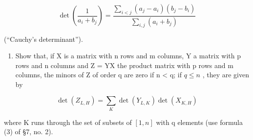 \[
\det \left(\frac {1}{a _ {i} + b _ {j}}\right) = \frac {\sum_ {i <   j} (a _ {j} - a _ {i}) (b _ {j} - b _ {i})}{\sum_ {i , j} (a _ {i} + b _ {j})}
\]

(``Cauchy's determinant'').

\begin{enumerate}
\def\labelenumi{\arabic{enumi}.}
\setcounter{enumi}{5}
\tightlist
\item
  Show that, if X is a matrix with n rows and m columns, Y a matrix with p rows and n columns and Z = YX the product matrix with p rows and m columns, the minors of Z of order q are zero if n \textless{} q; if \(q \leqslant n\) , they are given by
\end{enumerate}

\[
\det (Z _ {L, H}) = \sum_ {K} \det (Y _ {L, K}) \det (X _ {K, H})
\]

where K runs through the set of subsets of \([1, n]\) with q elements (use formula (3) of §7, no. 2).


